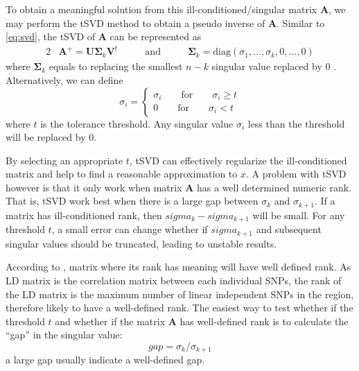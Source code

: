 \documentclass{book}
\begin{document}
			To obtain a meaningful solution from this ill-conditioned/singular matrix $\boldsymbol{A}$, we may perform the \gls{tSVD} method to obtain a pseudo inverse of $\boldsymbol{A}$.
			Similar to \cref{eq:svd}, the \gls{tSVD} of $\boldsymbol{A}$ can be represented as 
			\begin{alignat}{2}
				&\boldsymbol{A}^+ = \boldsymbol{U\Sigma}_k\boldsymbol{V}^t  &\qquad\text{and}\qquad  &\boldsymbol{\Sigma}_k=\mathrm{diag}(\sigma_1,\dots,\sigma_k,0,\dots,0)
				\label{eq:tsvd}				
			\end{alignat}
			where $\boldsymbol{\Sigma}_k$ equals to replacing the smallest $n-k$ singular value replaced by 0 \parencite{Hansen1987}. 
			Alternatively, we can define
			\begin{equation}
			\sigma_i=\begin{cases}
			\sigma_i\qquad\text{for}\qquad\sigma_i\ge t\\
			0\qquad\text{for}\qquad\sigma_i<t
			\end{cases}
			\end{equation}
			where $t$ is the tolerance threshold. 
			Any singular value $\sigma_i$ less than the threshold will be replaced by 0. 
			
			By selecting an appropriate $t$, \gls{tSVD} can effectively regularize the ill-conditioned matrix and help to find a reasonable approximation to $x$. 
			A problem with \gls{tSVD} however is that it only work when matrix $\boldsymbol{A}$ has a well determined numeric rank\parencite{Hansen1987}.
			That is, \gls{tSVD} work best when there is a large gap between $\sigma_k$ and $\sigma_{k+1}$.
			If a matrix has ill-conditioned rank, then $sigma_k-sigma_{k+1}$ will be small.
			For any threshold $t$, a small error can change whether if $sigma_{k+1}$ and subsequent singular values should be truncated, leading to unstable results. 
			
			According to \citet{Hansen1987}, matrix where its rank has meaning will have well defined rank. 
			As \gls{LD} matrix is the correlation matrix between each individual \glspl{SNP}, the rank of the \gls{LD} matrix is the maximum number of linear independent \glspl{SNP} in the region, therefore likely to have a well-defined rank. 
			The easiest way to test whether if the threshold $t$ and whether if the matrix $\boldsymbol{A}$ has well-defined rank is to calculate the ``gap'' in the singular value:
			\begin{equation}
			gap = \sigma_k/\sigma_{k+1}
			\label{eq:gapSingular}
			\end{equation}
			a large gap usually indicate a well-defined gap. 
			
\end{document}
